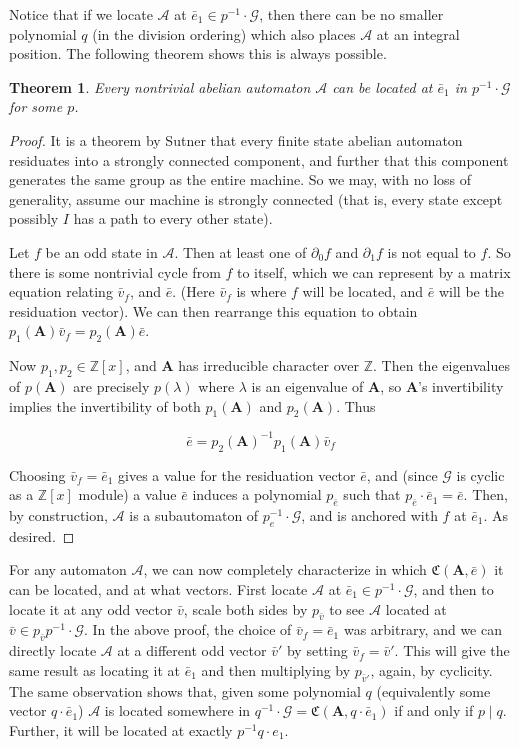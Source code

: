 \documentclass[final]{ws-ijac}
\newcommand{\A}{\mathcal{A}}
\newcommand{\G}{\mathcal{G}}
\newcommand{\C}{\mathfrak{C}(\Am,\e)}
\newcommand{\Z}{\mathbb{Z}}
\newcommand{\2}{\textbf{2}}
\newcommand{\Am}{\textbf{A}}
\newcommand{\del}{\partial}
\newcommand{\vv}{\bar{v}}
\newcommand{\e}{\bar{e}}
\newtheorem{thm}{Theorem}
\begin{document}
Notice that if we locate $\A$ at $\e_1 \in p^{-1} \cdot \G$, 
then there can be no smaller polynomial $q$ (in the division ordering)
which also places $\A$ at an integral position. The following theorem 
shows this is always possible.

\begin{thm}
  Every nontrivial abelian automaton $\A$ can be 
  located at $\e_1$ in $p^{-1} \cdot \G$ for some $p$.
\end{thm}

\begin{proof}
  It is a theorem by Sutner \cite{Sutner18:abelian_automata} that every 
  finite state abelian automaton residuates into a strongly connected component, 
  and further that this component generates the same group as the entire 
  machine. So we may, with no loss of generality, assume our machine is 
  strongly connected (that is, every state except possibly $I$ has a path to
  every other state).

  Let $f$ be an odd state in $\A$. Then at least one of $\del_0 f$ and 
  $\del_1 f$ is not equal to $f$. So there is some nontrivial cycle
  from $f$ to itself, which we can represent by a matrix equation 
  relating $\vv_f$, and $\e$. (Here $\vv_f$ is where $f$ will be located, 
  and $\e$ will be the residuation vector). 
  We can then rearrange this equation to obtain 
  $p_1(\Am)\vv_f = p_2(\Am)\e$.

  Now $p_1, p_2 \in \Z[x]$, and $\Am$ has irreducible character over $\Z$.
  Then the eigenvalues of $p(\Am)$ are precisely $p(\lambda)$
  where $\lambda$ is an eigenvalue of $\Am$, so $\Am$'s invertibility implies
  the invertibility of both $p_1(\Am)$ and $p_2(\Am)$. Thus

  \[ \e = p_2(\Am)^{-1}p_1(\Am)\vv_f \]

  Choosing $\vv_f = \e_1$ gives a value for the residuation vector $\e$,
  and (since $\G$ is cyclic as a $\Z[x]$ module) a value $\e$ induces a 
  polynomial $p_{\e}$ such that $p_{\e} \cdot \e_1 = \e$. 
  Then, by construction, $\A$ is a subautomaton of $p_e^{-1} \cdot \G$, and is 
  anchored with $f$ at $\e_1$. As desired.
\end{proof}

For any automaton $\A$, we can now completely characterize in
which $\C$ it can be located, and at what vectors.
First locate $\A$ at $\e_1 \in p^{-1} \cdot \G$, and then to locate it at
any odd vector $\vv$, scale both sides by $p_{\vv}$ to see $\A$ located at
$\vv \in p_{\vv} p^{-1} \cdot \G$. 
In the above proof, the choice of $\vv_f = \e_1$ was arbitrary, and we can
directly locate $\A$ at a different odd vector $\vv'$ by setting 
$\vv_f = \vv'$. This will give the same result as locating it at $\e_1$ and 
then multiplying by $p_{\vv'}$, again, by cyclicity.
The same observation shows that, given some polynomial $q$ 
(equivalently some vector $q \cdot \e_1$) $\A$ is located somewhere in 
$q^{-1} \cdot \G = \mathfrak{C}(\Am,q \cdot \e_1)$ if and only if $p \mid q$. 
Further, it will be located at exactly $p^{-1}q \cdot e_1$.
\end{document}
